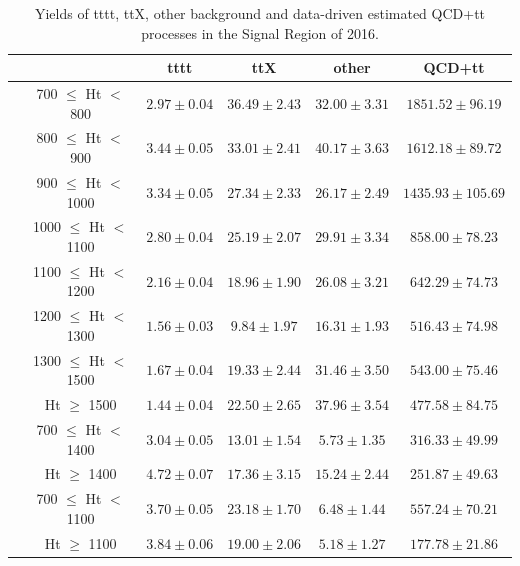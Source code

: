 \documentclass[twoside]{article}
\begin{document}
\begin{table}[h!]
\centering
\begin{adjustbox}{width=\textwidth}
\begin{tabular}{>{\raggedright\arraybackslash}p{3cm}ccccc}
\toprule
 & & \textbf{tttt} & \textbf{ttX} & \textbf{other} & \textbf{QCD+tt} \\
\midrule
\multirow{8}{*}{$N_{RT}=1, N_{BT}=0$} 
 & 700 $\leq$ Ht $<$ 800 & $2.97 \pm 0.04$ & $36.49 \pm 2.43$ & $32.00 \pm 3.31$ & $1851.52 \pm 96.19$ \\
 & 800 $\leq$ Ht $<$ 900 & $3.44 \pm 0.05$ & $33.01 \pm 2.41$ & $40.17 \pm 3.63$ & $1612.18 \pm 89.72$ \\
 & 900 $\leq$ Ht $<$ 1000 & $3.34 \pm 0.05$ & $27.34 \pm 2.33$ & $26.17 \pm 2.49$ & $1435.93 \pm 105.69$ \\
 & 1000 $\leq$ Ht $<$ 1100 & $2.80 \pm 0.04$ & $25.19 \pm 2.07$ & $29.91 \pm 3.34$ & $858.00 \pm 78.23$ \\
 & 1100 $\leq$ Ht $<$ 1200 & $2.16 \pm 0.04$ & $18.96 \pm 1.90$ & $26.08 \pm 3.21$ & $642.29 \pm 74.73$ \\
 & 1200 $\leq$ Ht $<$ 1300 & $1.56 \pm 0.03$ & $9.84 \pm 1.97$ & $16.31 \pm 1.93$ & $516.43 \pm 74.98$ \\
 & 1300 $\leq$ Ht $<$ 1500 & $1.67 \pm 0.04$ & $19.33 \pm 2.44$ & $31.46 \pm 3.50$ & $543.00 \pm 75.46$ \\
 & Ht $\geq$ 1500 & $1.44 \pm 0.04$ & $22.50 \pm 2.65$ & $37.96 \pm 3.54$ & $477.58 \pm 84.75$ \\
\midrule
\multirow{2}{*}{$N_{RT}=1, N_{BT}\geq1$} 
 & 700 $\leq$ Ht $<$ 1400 & $3.04 \pm 0.05$ & $13.01 \pm 1.54$ & $5.73 \pm 1.35$ & $316.33 \pm 49.99$ \\
 & Ht $\geq$ 1400 & $4.72 \pm 0.07$ & $17.36 \pm 3.15$ & $15.24 \pm 2.44$ & $251.87 \pm 49.63$ \\
\midrule
\multirow{2}{*}{$N_{RT}\geq2$} 
 & 700 $\leq$ Ht $<$ 1100 & $3.70 \pm 0.05$ & $23.18 \pm 1.70$ & $6.48 \pm 1.44$ & $557.24 \pm 70.21$ \\
 & Ht $\geq$ 1100 & $3.84 \pm 0.06$ & $19.00 \pm 2.06$ & $5.18 \pm 1.27$ & $177.78 \pm 21.86$ \\
\bottomrule
\end{tabular}
\end{adjustbox}
\caption{Yields of tttt, ttX, other background and data-driven estimated QCD+tt processes in the Signal Region of 2016.}
\label{fig:yield2016}
\end{table}
\end{document}
